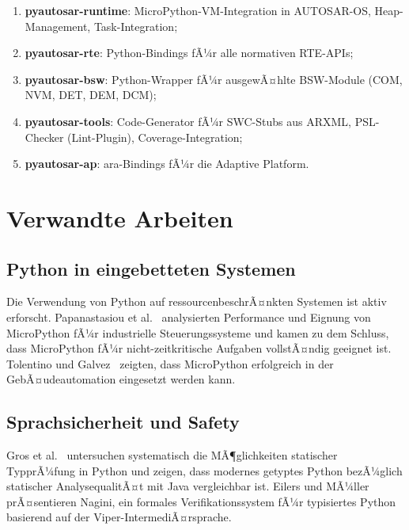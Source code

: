 ﻿\documentclass[12pt,a4paper,twoside]{article}
\begin{document}
\begin{enumerate}
  \item \textbf{pyautosar-runtime}: MicroPython-VM-Integration in AUTOSAR-OS,
        Heap-Manage\-ment, Task-Integration;
  \item \textbf{pyautosar-rte}: Python-Bindings fÃ¼r alle normativen RTE-APIs;
  \item \textbf{pyautosar-bsw}: Python-Wrapper fÃ¼r ausgewÃ¤hlte BSW-Module
        (COM, NVM, DET, DEM, DCM);
  \item \textbf{pyautosar-tools}: Code-Generator fÃ¼r SWC-Stubs aus ARXML,
        PSL-Checker (Lint-Plugin), Coverage-Integration;
  \item \textbf{pyautosar-ap}: ara-Bindings fÃ¼r die Adaptive Platform.
\end{enumerate}

\section{Verwandte Arbeiten}
\label{sec:verwandte}

\subsection{Python in eingebetteten Systemen}

Die Verwendung von Python auf ressourcenbeschrÃ¤nkten Systemen ist
aktiv erforscht. Papanastasiou et al.~\cite{papanastasiou2021micropython} analysierten
Performance und Eignung von MicroPython fÃ¼r industrielle Steuerungssysteme
und kamen zu dem Schluss, dass MicroPython fÃ¼r nicht-zeitkritische Aufgaben
vollstÃ¤ndig geeignet ist. Tolentino und Galvez~\cite{tolentino2019micropython} zeigten,
dass MicroPython erfolgreich in der GebÃ¤udeautomation eingesetzt werden kann.

\subsection{Sprachsicherheit und Safety}

Gros et al.~\cite{gros2021python_types} untersuchen systematisch die MÃ¶glichkeiten
statischer TypprÃ¼fung in Python und zeigen, dass modernes getyptes Python
bezÃ¼glich statischer AnalysequalitÃ¤t mit Java vergleichbar ist.
Eilers und MÃ¼ller~\cite{nagini2018} prÃ¤sentieren Nagini, ein formales Verifikationssystem
fÃ¼r typisiertes Python basierend auf der Viper-IntermediÃ¤rsprache.
\end{document}

